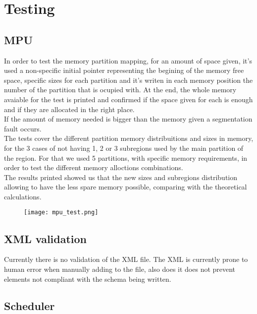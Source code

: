 \chapter{Testing}

\section{MPU}
In order to test the memory partition mapping, for an amount of space given, it's used a non-specific initial
 pointer representing the begining of the memory free space, specific sizes for each partition and it's
  writen in each memory position the number of the partition that is ocupied with. At the end, the
   whole memory avaiable for the test is printed and confirmed if the space given for each is enough and if they are allocated in the right place.\\
  If the amount of memory needed is bigger than the memory given a segmentation fault occurs.\\
 The tests cover the different partition memory distribuitions and sizes in memory, for the 3 cases of not
  having 1, 2 or  3 subregions used by the main partition of the region. For that we used 5 partitions, with
   specific memory requirements, in order to test the different memory alloctions combinations.\\
  The results printed showed us that the new sizes and subregions distribution allowing to have the less 
  spare memory possible, comparing with the theoretical calculations.\\
\begin{figure}[H]
\centering
\texttt{[image: mpu\_test.png]}
\label{fig:testing_mpu}
\end{figure}

\section{XML validation}

Currently there is no validation of the XML file. 
The XML is currently prone to human error when manually 
adding to the file, also does it does not prevent elements 
not compliant with the schema being written. 
\\


\section{Scheduler}

